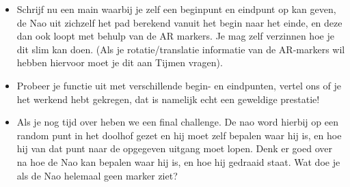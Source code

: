 \documentclass[a4paper]{article}
\begin{document}
\begin{Exercise}
\begin{itemize}
\item Schrijf nu een main waarbij je zelf een beginpunt en eindpunt op kan geven, de Nao uit zichzelf het pad berekend vanuit het begin naar het einde, en deze dan ook loopt met behulp van de AR markers. Je mag zelf verzinnen hoe je dit slim kan doen. (Als je rotatie/translatie informatie van de AR-markers wil hebben hiervoor moet je dit aan Tijmen vragen).
\item Probeer je functie uit met verschillende begin- en eindpunten, vertel ons of je het werkend hebt gekregen, dat is namelijk echt een geweldige prestatie!
\item Als je nog tijd over heben we een final challenge. De nao word hierbij op een random punt in het doolhof gezet en hij moet zelf bepalen waar hij is, en hoe hij van dat punt naar de opgegeven uitgang moet lopen. Denk er goed over na hoe de Nao kan bepalen waar hij is, en hoe hij gedraaid staat. Wat doe je als de Nao helemaal geen marker ziet?
\end{itemize}
\end{Exercise}
\vspace{10 mm}
\end{document}
